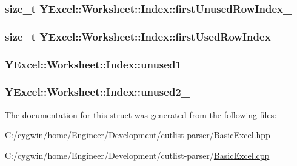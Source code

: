 \subsubsection[{first\+Unused\+Row\+Index\+\_\+}]{\setlength{\rightskip}{0pt plus 5cm}size\+\_\+t Y\+Excel\+::\+Worksheet\+::\+Index\+::first\+Unused\+Row\+Index\+\_\+}\label{struct_y_excel_1_1_worksheet_1_1_index_a941e6597fa0703bf19eb3e9563da14e8}
\hypertarget{struct_y_excel_1_1_worksheet_1_1_index_af9c6622fef186a8ac7ee11217e6adb7b}{}
\subsubsection[{first\+Used\+Row\+Index\+\_\+}]{\setlength{\rightskip}{0pt plus 5cm}size\+\_\+t Y\+Excel\+::\+Worksheet\+::\+Index\+::first\+Used\+Row\+Index\+\_\+}\label{struct_y_excel_1_1_worksheet_1_1_index_af9c6622fef186a8ac7ee11217e6adb7b}
\hypertarget{struct_y_excel_1_1_worksheet_1_1_index_aea12784b721dc465e67ff33dcda1dcf1}{}
\subsubsection[{unused1\+\_\+}]{ Y\+Excel\+::\+Worksheet\+::\+Index\+::unused1\+\_\+}\label{struct_y_excel_1_1_worksheet_1_1_index_aea12784b721dc465e67ff33dcda1dcf1}
\hypertarget{struct_y_excel_1_1_worksheet_1_1_index_a24316252150b80c27d4dbede7bf91724}{}
\subsubsection[{unused2\+\_\+}]{ Y\+Excel\+::\+Worksheet\+::\+Index\+::unused2\+\_\+}\label{struct_y_excel_1_1_worksheet_1_1_index_a24316252150b80c27d4dbede7bf91724}


The documentation for this struct was generated from the following files\+:\begin{DoxyCompactItemize}
\item 
C\+:/cygwin/home/\+Engineer/\+Development/cutlist-\/parser/\hyperlink{_basic_excel_8hpp}{Basic\+Excel.\+hpp}\item 
C\+:/cygwin/home/\+Engineer/\+Development/cutlist-\/parser/\hyperlink{_basic_excel_8cpp}{Basic\+Excel.\+cpp}\end{DoxyCompactItemize}
